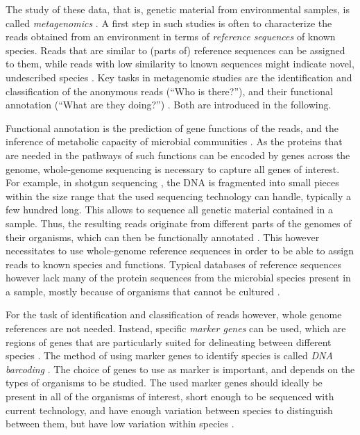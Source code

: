 The study of these data, that is, genetic material from environmental samples, is called \emph{metagenomics} \cite{Oulas2015}.
A first step in such studies is often to characterize the reads obtained from an environment
in terms of \emph{reference sequences} of known species.
Reads that are similar to (parts of) reference sequences can be assigned to them,
while reads with low similarity to known sequences might indicate novel, undescribed species \cite{Temperton2012}.
Key tasks in metagenomic studies are the identification and classification of the anonymous reads (``Who is there?''),
and their functional annotation (``What are they doing?'') \cite{Desai2012}.
Both are introduced in the following.

Functional annotation \cite{Stein2001} is the prediction of gene functions of the reads,
and the inference of metabolic capacity of microbial communities \cite{Brown2017}.
As the proteins that are needed in the pathways of such functions can be encoded by genes across the genome,
whole-genome sequencing is necessary to capture all genes of interest.
For example, in shotgun sequencing \cite{Staden1979,Anderson1981},
the DNA is fragmented into small pieces within the size range that the used sequencing technology can handle,
typically a few hundred \si{\basepair} long.
This allows to sequence all genetic material contained in a sample.
Thus, the resulting reads originate from different parts of the genomes of their organisms,
which can then be functionally annotated \cite{Glass2010}.
This however necessitates to use whole-genome reference sequences
in order to be able to assign reads to known species and functions.
Typical databases of reference sequences however
lack many of the protein sequences from the microbial species present in a sample,
mostly because of organisms that cannot be cultured \cite{Brown2017}.

For the task of identification and classification of reads however, whole genome references are not needed.
Instead, specific \emph{marker genes} can be used,
which are regions of genes that are particularly suited for delineating between different species \cite{Ren2016}.
The method of using marker genes to identify species is called \emph{DNA barcoding} \cite{Hebert2003,Savolainen2005,Deiner2017b}.
The choice of genes to use as marker is important, and depends on the types of organisms to be studied.
The used marker genes should ideally be present in all of the organisms of interest,
short enough to be sequenced with current technology,
and have enough variation between species to distinguish between them,
but have low variation within species \cite{Kress2008}.

